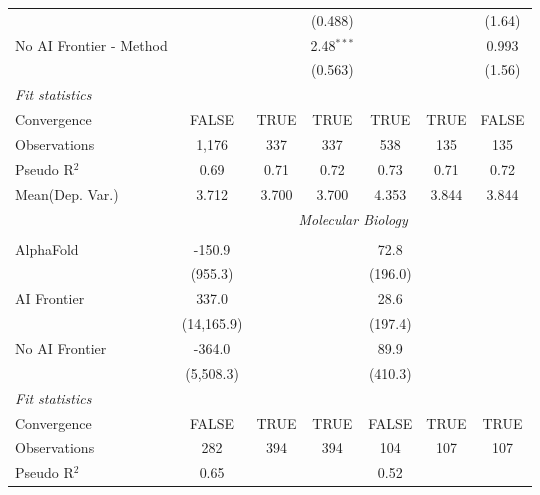 \begin{tabular}{lcccccc}
                           &         &               & (0.488)      &              &           & (1.64)\\   
   No AI Frontier - Method &         &               & 2.48$^{***}$ &              &           & 0.993\\   
                           &         &               & (0.563)      &              &           & (1.56)\\   
   \midrule
   \emph{Fit statistics}\\
   Convergence             &FALSE    & TRUE          & TRUE         & TRUE         & TRUE      & FALSE\\  
   Observations            & 1,176   & 337           & 337          & 538          & 135       & 135\\  
   Pseudo R$^2$            & 0.69    & 0.71          & 0.72         & 0.73         & 0.71      & 0.72\\  
Mean(Dep. Var.) & 3.712 & 3.700 & 3.700 & 4.353 & 3.844 & 3.844 \\
   
 & \multicolumn{6}{c}{\textit{Molecular Biology}} \\ \\
   AlphaFold      & -150.9     &      &      & 72.8    &      &   \\   
                  & (955.3)    &      &      & (196.0) &      &   \\   
   AI Frontier    & 337.0      &      &      & 28.6    &      &   \\   
                  & (14,165.9) &      &      & (197.4) &      &   \\   
   No AI Frontier & -364.0     &      &      & 89.9    &      &   \\   
                  & (5,508.3)  &      &      & (410.3) &      &   \\   
   \midrule
   \emph{Fit statistics}\\
   Convergence    &FALSE       & TRUE & TRUE & FALSE   & TRUE & TRUE\\  
   Observations   & 282        & 394  & 394  & 104     & 107  & 107\\  
   Pseudo R$^2$   & 0.65       &      &      & 0.52    &      & \\  
   

\end{tabular}
